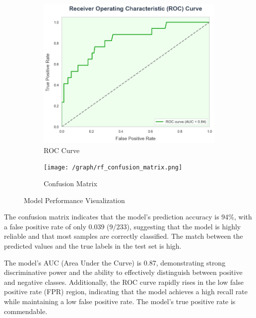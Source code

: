 \documentclass{mcmthesis}
\begin{document}
\begin{figure}[H]
    \centering
    \begin{subfigure}{0.4\textwidth}
        \centering
        \includegraphics[width=\textwidth]{graph/rf_roc.png}
        \caption{ROC Curve}
        \label{subfig:player1}
    \end{subfigure}
    \hfill
    \begin{subfigure}{0.4\textwidth}
        \centering
        \texttt{[image: /graph/rf\_confusion\_matrix.png]}
        \caption{Confusion Matrix}
        \label{subfig:player2}
    \end{subfigure}
    \caption{Model Performance Visualization}
    \label{Figure 13}
\end{figure}

    The confusion matrix indicates that the model's prediction accuracy is 94\%, with a false positive rate of only 0.039 (9/233), suggesting that the model is highly reliable and that most samples are correctly classified. The match between the predicted values and the true labels in the test set is high.

    The model's AUC (Area Under the Curve) is 0.87, demonstrating strong discriminative power and the ability to effectively distinguish between positive and negative classes. Additionally, the ROC curve rapidly rises in the low false positive rate (FPR) region, indicating that the model achieves a high recall rate while maintaining a low false positive rate. The model's true positive rate is commendable.
\end{document}
